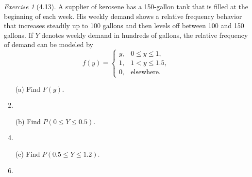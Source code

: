 \documentclass[12pt]{amsart}
\makeatletter
\theoremstyle{remark}
\newtheorem*{exercise}{Exercise}%
\renewenvironment{proof}[1][\proofname]{\par\doublespacing
  \pushQED{\qed}%
  \normalfont \topsep6\p@\@plus6\p@\relax
  \list{}{%
    \settowidth{\leftmargin}{\itshape\proofname:\hskip\labelsep}%
    \setlength{\labelwidth}{0pt}%
    \setlength{\itemindent}{-\leftmargin}%
  }%
  \item[\hskip\labelsep\itshape#1\@addpunct{:}]\ignorespaces
}{%
  \popQED\endlist\@endpefalse
  \singlespacing
}
\theoremstyle{mycomment}
\makeatother
\begin{document}
\begin{exercise}[4.13]
A supplier of kerosene has a 150-gallon tank that is filled at the beginning of each week. His weekly demand shows a relative frequency behavior that increases steadily up to 100 gallons and then levels off between 100 and 150 gallons. If $Y$ denotes weekly demand in hundreds of gallons, the relative frequency of demand can be modeled by
$$f(y) = \begin{cases}
y, & 0 \leq y \leq 1, \\
1, & 1 < y \leq 1.5, \\
0, & \text{elsewhere}.
\end{cases}$$

\begin{enumerate}
    \item[(a)] Find $F(y)$.
\begin{proof}[Solution]
 
\end{proof}
    \item[(b)] Find $P(0 \leq Y \leq 0.5)$.
\begin{proof}[Solution]
 
\end{proof}
    \item[(c)] Find $P(0.5 \leq Y \leq 1.2)$.
\begin{proof}[Solution]
 
\end{proof}
\end{enumerate} 
\end{exercise}
\end{document}
